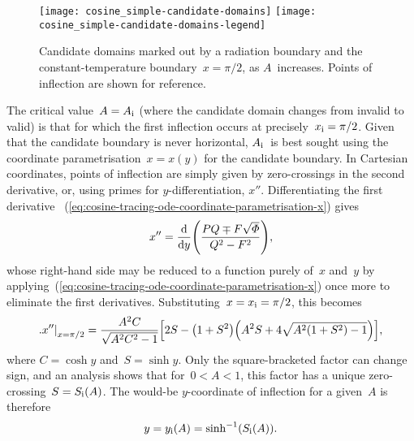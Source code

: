 \begin{figure}
  \newcommand*{\legendtrimwidth}{0.1\textwidth}
  \newcommand*{\legendoffsetheight}{0.36\textwidth}
  \centering
  \texttt{[image: cosine\_simple-candidate-domains]}
  \texttt{[image: cosine\_simple-candidate-domains-legend]}
  \caption{
    Candidate domains marked out by a radiation boundary
    and the constant-temperature boundary~$x = \pi/2$,
    as $A$~increases.
    Points of inflection are shown for reference.
  }
  \label{fig:cosine_simple-candidate-domains}
\end{figure}

The critical value~$A = A_{\mathrm{i}}$
(where the candidate domain changes from invalid to valid)
is that for which the first inflection occurs at precisely~$x_{\mathrm{i}} = \pi/2$.
Given that the candidate boundary is never horizontal,
$A_{\mathrm{i}}$~is best sought using the coordinate parametrisation~$x = x (y)$
for the candidate boundary.
In Cartesian coordinates, points of inflection
are simply given by zero-crossings in the second derivative,
or, using primes for $y$-differentiation, $x''$.
Differentiating the first derivative~%
  (\ref{eq:cosine-tracing-ode-coordinate-parametrisation-x})
gives
\begin{equation}
  x'' = \tder{}{y} \roundbr*{\frac{P Q \mp F \sqrt{\Phi}}{Q^2 - F^2}},
  \label{eq:acceleration-traced-boundary-cartesian-by-y}
\end{equation}
whose right-hand side may be reduced to a function purely of~$x$ and~$y$
by applying~(\ref{eq:cosine-tracing-ode-coordinate-parametrisation-x})
once more to eliminate the first derivatives.
Substituting~$x = x_{\mathrm{i}} = \pi/2$, this becomes
\begin{equation}
  \eval[\textsize]{x''}_{x=\pi/2} =
    \frac{A^2 C}{\sqrt{A^2 C^2 - 1}}
    \squarebr*{
      2 S - \roundbr*{1 + S^2} \roundbr*{A^2 S + 4 \sqrt{A^2 (1 + S^2) - 1}}
    },
  \label{eq:%
    cosine-simple-traced-boundary-acceleration-cartesian-by-y-inflection%
  }
\end{equation}
where $C = \cosh y$ and~$S = \sinh y$.
Only the square-bracketed factor can change sign,
and an analysis shows that for~$0 < A < 1$,
this factor has a unique zero-crossing~$S = S_{\mathrm{i}} (A)$.
The would-be $y$-coordinate of inflection for a given~$A$ is therefore
\begin{equation}
  y = y_\infl (A) = \sinh^{-1} \roundbr[\bulkysize]{S_\infl (A)}.
  \label{eq:cosine-simple-traced-boundary-y-would-be-inflection}
\end{equation}
